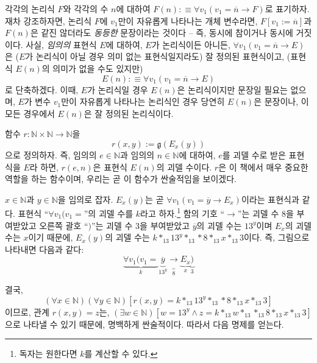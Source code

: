 \documentclass[12pt]{paper}
\newcommand{\gnum}
{ \mathfrak{g}
}
\begin{document}
  각각의 논리식 $F$와 각각의 수 $n$에 대하여 $F \left( n \right) : \equiv \forall v_1 \left( v_1 = \overline{n} \rightarrow F \right)$로 표기하자.
  재차 강조하자면, 논리식 $F$에 $v_1$만이 자유롭게 나타나는 개체 변수라면,
  $F \left[ v_1 := \overline{n} \right]$과 $F \left( n \right)$은 같진 않더라도 \textit{동등한} 문장이라는 것이다 --
  즉, 동시에 참이거나 동시에 거짓이다.
  사실, \textit{임의의} 표현식 $E$에 대하여, $E$가 논리식이든 아니든,
  $\forall v_1 \left( v_1 = \overline{n} \rightarrow E \right)$은 ($E$가 논리식이 아닐 경우 의미 없는 표현식일지라도) 잘 정의된 표현식이고,
  (표현식 $E \left( n \right)$의 의미가 없을 수도 있지만) $$E \left( n \right) : \equiv \forall v_1 \left( v_1 = \overline{n} \rightarrow E \right)$$로 단축하겠다.
  이때, $E$가 논리식일 경우 $E \left( n \right)$은 논리식이지만 문장일 필요는 없으며,
  $E$가 변수 $v_1$만이 자유롭게 나타나는 논리식인 경우 당연히 $E \left( n \right)$은 문장이나,
  이 모든 경우에서 $E \left( n \right)$은 잘 정의된 논리식이다.

  함수 $r : \mathbb{N} \times \mathbb{N} \to \mathbb{N}$을 $$ r \left( x , y \right) := \gnum \left( E_x \left( y \right) \right) $$으로 정의하자.
  즉, 임의의 $e \in \mathbb{N}$과 임의의 $n \in \mathbb{N}$에 대하여,
  $e$를 괴델 수로 받은 표현식을 $E$라 하면, $r \left( e , n \right)$은 표현식 $E \left( n \right)$의 괴델 수이다.
  $r$은 이 책에서 매우 중요한 역할을 하는 함수이며, 우리는 곧 이 함수가 싼술적임을 보이겠다.

  $x \in \mathbb{N}$과 $y \in \mathbb{N}$을 임의로 잡자.
  $E_x \left( y \right)$는 곧 $\forall v_1 \left( v_1 = \overline{y} \rightarrow E_x \right)$이라는 표현식과 같다.
  표현식 ``$ \forall v_1 ( v_1 = $''의 괴델 수를 $k$라고 하자.\footnote
  {
    독자는 원한다면 $k$를 계산할 수 있다.
  }
  함의 기호 ``$\rightarrow$''는 괴델 수 $8$을 부여받았고
  오른쪽 괄호 ``$)$''는 괴델 수 $3$을 부여받았고
  $\overline{y}$의 괴델 수는 $13^{y}$이며 $E_x$의 괴델 수는 $x$이기 때문에,
  $E_x \left( y \right)$의 괴델 수는 $k *_{13} 13^{y} *_{13} * 8 *_{13} x *_{13} 3$이다.
  즉, 그림으로 나타내면 다음과 같다: $$ \underbrace{\forall v_1 ( v_1 =}_{k} \underbrace{\overline{y}}_{13^{y}} \underbrace{\rightarrow}_{8} \underbrace{E_x}_{x} \underbrace{)}_{3}$$

  결국, $$\left( \forall x \in \mathbb{N} \right) \left( \forall y \in \mathbb{N} \right) \left[ r \left( x , y \right) = k *_{13} 13^{y} *_{13} * 8 *_{13} x *_{13} 3 \right]$$이므로,
  관계 $r \left( x , y \right) = z$는, $\left( \exists w \in \mathbb{N} \right) \left[ w = 13^{y} \land z = k *_{13} w *_{13} *_{13} 8 *_{13} x *_{13} 3 \right]$으로 나타낼 수 있기 때문에, 명백하게 싼술적이다.
  따라서 다음 명제를 얻는다.
\end{document}
